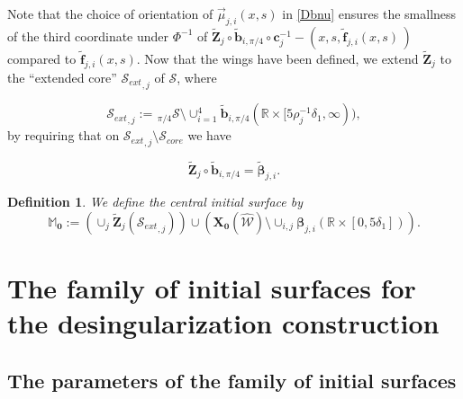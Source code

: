 \documentclass[12pt,namelimits,sumlimits]{amsart}
\newtheorem{definition}[theorem]{Definition}
\theoremstyle{remark}
\numberwithin{equation}{section}
\begin{document}
Note that the choice of orientation of
${\vec{\mu}}_{j,i}(x,s)$ 
in \ref{Dbnu}
ensures the 
smallness of the third coordinate under $\Phi^{-1}$ of
${\widetilde{\boldsymbol{Z}}}_j\circ {\widetilde{\boldsymbol{b}}}_{i,\pi/4}\circ{\boldsymbol{c}}_j^{-1}-(x,s,{\widetilde{\boldsymbol{f}}}_{j,i}(x,s)\,)$
compared to ${\widetilde{\boldsymbol{f}}}_{j,i}(x,s)$.
Now that the wings have been defined, we extend ${\widetilde{\boldsymbol{Z}}}_j$ to the ``extended core'' ${{\mathcal{S}_{ext}}}_{,j}$
of ${{\mathcal{S}}}$, where
\addtocounter{theorem}{1}
\begin{equation}
\label{ESext}
{{\mathcal{S}_{ext}}}_{,j}:=
{{{}_{\,\pi/4\!}\mathcal{S}}}\setminus\cup_{i=1}^4{\widetilde{\boldsymbol{b}}}_{i,\pi/4}({\mathbb{R}}\times[5\rho_j^{-1}\delta_1,\infty)),
\end{equation}
by requiring that on ${{\mathcal{S}_{ext}}}_{,j}\setminus{{\mathcal{S}_{core}}}$
we have
\addtocounter{theorem}{1}
\begin{equation}
\label{EZtiwings}
{\widetilde{\boldsymbol{Z}}}_j\circ{\widetilde{\boldsymbol{b}}}_{{i,\pi/4}}
=
{\widetilde{\boldsymbol{\beta}}}_{{j,i}}.
\end{equation}

\addtocounter{equation}{1}
\begin{definition}
\label{Dcentral}
We define the central initial surface by
$$
{\mathbb{M}}_{{\boldsymbol{0}}}:=
\left(\cup_j{\widetilde{\boldsymbol{Z}}}_j({{\mathcal{S}_{ext}}}_{,j})\right)
\cup
\left({\boldsymbol{X}}_{{\boldsymbol{0}}}({{\widehat{{\mathcal{W}}}}})\setminus \cup_{i,j}
{\boldsymbol{\beta}}_{j,i}({\mathbb{R}}\times[0,5\delta_1])  \right).
$$
\end{definition}

\section{The family of initial surfaces for the desingularization construction}
\label{Sfamily}
\nopagebreak

\subsection*{The parameters of the family of initial surfaces}
$\phantom{ab}$
\nopagebreak
\end{document}
